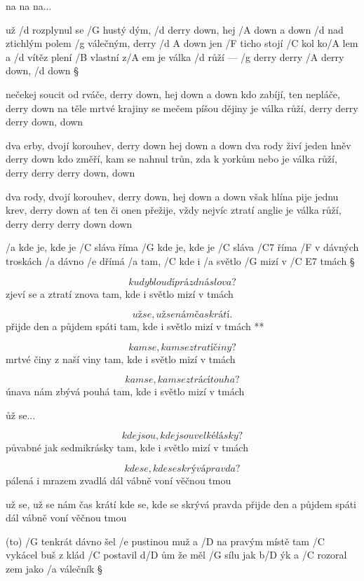 na na na...




už /d rozplynul se /G hustý dým, /d derry down, hej /A down a down
/d nad ztichlým polem /g válečným, derry /{d A} down
jen /F ticho stojí /C kol ko/A lem a /d vítěz plení /B vlastní z/A em
je válka /d růží --- /g derry derry /A derry down, /d down \S

nečekej soucit od rváče, derry down, hej down a down
kdo zabíjí, ten nepláče, derry down
na těle mrtvé krajiny se mečem píšou dějiny
je válka růží, derry derry derry down, down \s

dva erby, dvojí korouhev, derry down hej down a down
dva rody živí jeden hněv derry down
kdo změří, kam se nahnul trůn, zda k yorkům nebo 
je válka růží, derry derry derry down, down \s

dva rody, dvojí korouhev, derry down, hej down a down
však hlína pije jednu krev, derry down
ať ten či onen přežije, vždy nejvíc ztratí anglie
je válka růží, derry derry derry down down




/a kde je, kde je /C sláva říma
/G kde je, kde je /C sláva /C7 říma
/F v dávných troskách /a dávno /e dřímá
/a tam, /C kde i /a světlo /G mizí v /{C E7} tmách \S

\[ kudy bloudí prázdná slova? \]
zjeví se a ztratí znova
tam, kde i světlo mizí v tmách \s

\R \[ už se, už se nám čas krátí. \]
   přijde den a půjdem spáti
   tam, kde i světlo mizí v tmách **

\[ kam se, kam se ztratí činy? \]
mrtvé činy z naší viny
tam, kde i světlo mizí v tmách \s

\[ kam se, kam se ztrácí touha? \]
únava nám zbývá pouhá
tam, kde i světlo mizí v tmách \s

\r už se...

\[ kde jsou, kde jsou velké lásky? \]
půvabné jak sedmikrásky
tam, kde i světlo mizí v tmách \s

\[ kde se, kde se skrývá pravda? \]
pálená i mrazem zvadlá
dál vábně voní věčnou tmou \s

už se, už se nám čas krátí
kde se, kde se skrývá pravda
přijde den a půjdem spáti
dál vábně voní věčnou tmou




(to) /G tenkrát dávno šel /e pustinou muž
a /D na pravým místě tam /C vykácel buš
z klád /C postavil d/D ům že měl /G sílu jak b/D ýk
a /C rozoral zem jako /a válečník \S

